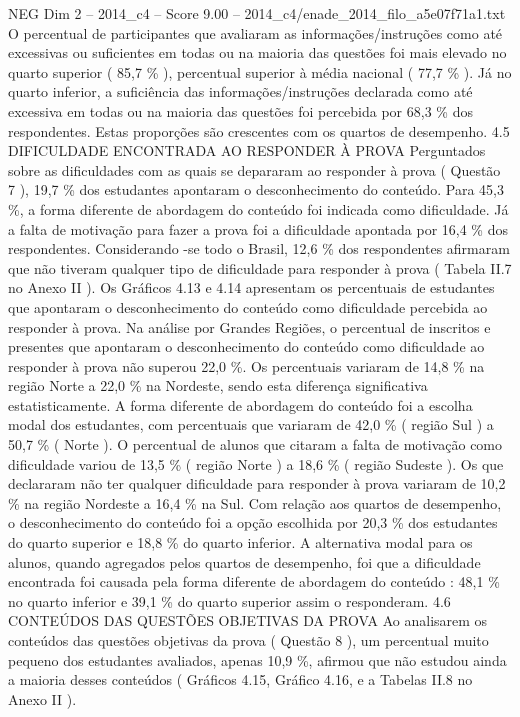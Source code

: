 \begin{textsample}{NEG Dim 2 – 2014\_c4 – Score 9.00 – 2014\_c4/enade\_2014\_filo\_a5e07f71a1.txt}
O percentual de participantes que avaliaram as informações/instruções como até excessivas ou suficientes em todas ou na maioria das questões foi mais elevado no quarto superior ( 85,7 \% ), percentual superior à média nacional ( 77,7 \% ).
Já no quarto inferior, a suficiência das informações/instruções declarada como até excessiva em todas ou na maioria das questões foi percebida por 68,3 \% dos respondentes.
Estas proporções são crescentes com os quartos de desempenho. 4.5 DIFICULDADE ENCONTRADA AO RESPONDER À PROVA Perguntados sobre as dificuldades com as quais se depararam ao responder à prova ( Questão 7 ), 19,7 \% dos estudantes apontaram o desconhecimento do conteúdo.
Para 45,3 \%, a forma diferente de abordagem do conteúdo foi indicada como dificuldade.
Já a falta de motivação para fazer a prova foi a dificuldade apontada por 16,4 \% dos respondentes.
Considerando -se todo o Brasil, 12,6 \% dos respondentes afirmaram que não tiveram qualquer tipo de dificuldade para responder à prova ( Tabela II.7 no Anexo II ).
Os Gráficos 4.13 e 4.14 apresentam os percentuais de estudantes que apontaram o desconhecimento do conteúdo como dificuldade percebida ao responder à prova.
Na análise por Grandes Regiões, o percentual de inscritos e presentes que apontaram o desconhecimento do conteúdo como dificuldade ao responder à prova não superou 22,0 \%.
Os percentuais variaram de 14,8 \% na região Norte a 22,0 \% na Nordeste, sendo esta diferença significativa estatisticamente.
A forma diferente de abordagem do conteúdo foi a escolha modal dos estudantes, com percentuais que variaram de 42,0 \% ( região Sul ) a 50,7 \% ( Norte ).
O percentual de alunos que citaram a falta de motivação como dificuldade variou de 13,5 \% ( região Norte ) a 18,6 \% ( região Sudeste ).
Os que declararam não ter qualquer dificuldade para responder à prova variaram de 10,2 \% na região Nordeste a 16,4 \% na Sul.
Com relação aos quartos de desempenho, o desconhecimento do conteúdo foi a opção escolhida por 20,3 \% dos estudantes do quarto superior e 18,8 \% do quarto inferior.
A alternativa modal para os alunos, quando agregados pelos quartos de desempenho, foi que a dificuldade encontrada foi causada pela forma diferente de abordagem do conteúdo : 48,1 \% no quarto inferior e 39,1 \% do quarto superior assim o responderam. 4.6 CONTEÚDOS DAS QUESTÕES OBJETIVAS DA PROVA Ao analisarem os conteúdos das questões objetivas da prova ( Questão 8 ), um percentual muito pequeno dos estudantes avaliados, apenas 10,9 \%, afirmou que não estudou ainda a maioria desses conteúdos ( Gráficos 4.15, Gráfico 4.16, e a Tabelas II.8 no Anexo II ).

\end{textsample}
